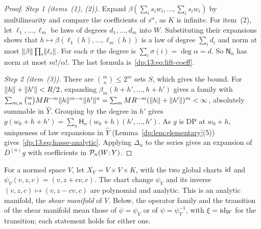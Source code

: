 \begin{proof}
\emph{Step 1 (items~(1), (2)).} Expand $\beta(\sum_is_iw_i,\dots,\sum_is_iw_i)$ by multilinearity and compare the coefficients of $s^\alpha$, as $K$ is infinite. For item~(2), let $\ell_1,\dots,\ell_m$ be laws of degrees $d_1,\dots,d_m$ into $W$. Substituting their expansions shows that $h\mapsto\beta(\ell_1(h),\dots,\ell_m(h))$ is a law of degree $\sum_id_i$ and norm at most $\lVert \beta\rVert\prod_i\lVert \ell_i\rVert$. For each $\sigma$ the degree is $\sum_i\sigma(i)=\deg\alpha=d$. So $\mathsf N_\alpha$ has norm at most $m!/\alpha!$. The last formula is~\eqref{dp:13:eq:lift-coeff}.

\emph{Step 2 (item~(3)).} There are $\binom mn\le2^m$ sets $S$, which gives the bound. For $\lVert h\rVert+\lVert h'\rVert<R/2$, expanding $\beta_m(h+h',\dots,h+h')$ gives a family with $\sum_{m,n}\binom mnMR^{-m}\lVert h\rVert^{m-n}\lVert h'\rVert^n=\sum_mMR^{-m}(\lVert h\rVert+\lVert h'\rVert)^m<\infty$, absolutely summable in $\widehat Y$. Grouping by the degree in $h'$ gives $g(w_0+h+h')=\sum_n\mathsf H_n(w_0+h)(h',\dots,h')$. As $g$ is DP at $w_0+h$, uniqueness of law expansions in $\widehat Y$ (Lemma~\ref{dp:lem:elementary}(5)) gives~\eqref{dp:13:eq:hasse-analytic}. Applying $\Delta_n$ to the series gives an expansion of $D^{(n)}g$ with coefficients in $\mathcal P_n(W;Y)$.
\end{proof}

\begin{definition}\label{dp:13:def:shear}
For a normed space $V$, let $X_V=V\times V\times K$, with the two global charts $\mathrm{id}$ and $\psi_V(v,z,c)=(v,z+cv,c)$. The chart change $\psi_V$ and its inverse $(v,z,c)\mapsto(v,z-cv,c)$ are polynomial and analytic. This is an analytic manifold, the \emph{shear manifold} of $V$. Below, the operator family and the transition of the shear manifold mean those of $\psi=\psi_V$ or of $\psi=\psi_V^{-1}$, with $\xi=\mathrm{id}_W$ for the transition; each statement holds for either one.
\end{definition}

